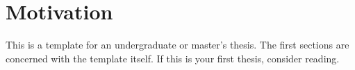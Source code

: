 \chapter{Motivation}\label{chap:motivation}
This is a template for an undergraduate or master's thesis.
The first sections are concerned with the template itself. If this is your first
thesis, consider reading.